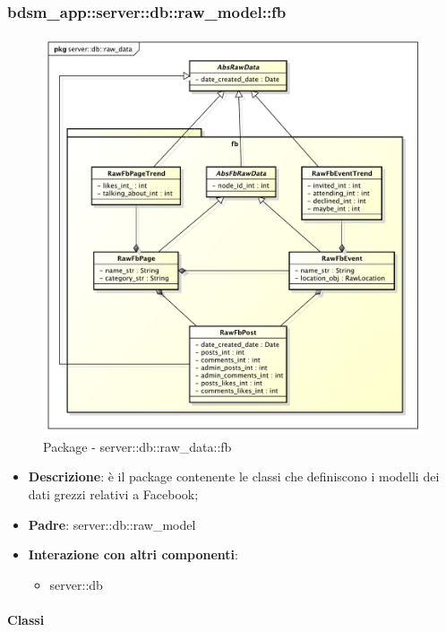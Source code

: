		\subsubsection{bdsm\_app::server::db::raw\_model::fb} %
		\label{ssub:bdsm_app_server_db_raw_model_fb}
		\begin{figure}[htbp]
			\centering
			\centerline{\includegraphics[scale=0.5]{./images/server/raw_data_fb.pdf}}
			\caption{Package - server::db::raw\_data::fb}
		\end{figure}

		\begin{itemize}
		  \item \textbf{Descrizione}:  è il package contenente le classi che definiscono i modelli dei dati grezzi relativi a Facebook;
		  \item \textbf{Padre}: server::db::raw\_model
		  \item \textbf{Interazione con altri componenti}:
		  	\begin{itemize}
		  		\item server::db
				\end{itemize}
		\end{itemize}

		\paragraph{Classi} %

